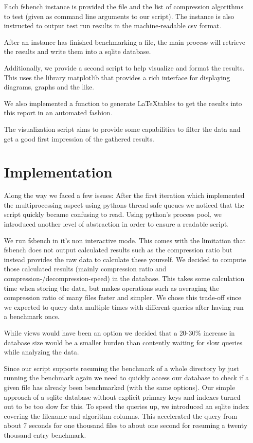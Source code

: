 \documentclass[
	12pt,
	a4paper,
	BCOR10mm,
	DIV14,
	listof=totoc,
	bibliography=totoc,
	headsepline
]{scrreprt}
\begin{document}
Each fsbench instance is provided the file and the list of compression algorithms to test (given as command line arguments to our script). The instance is also instructed to output test run results in the machine-readable csv format.

After an instance has finished benchmarking a file, the main process will retrieve the results and write them into a sqlite database.

Additionally, we provide a second script to help visualize and format the results.
This uses the library matplotlib that provides a rich interface for displaying diagrams, graphs and the like.

We also implemented a function to generate \LaTeX tables to get the results into this report in an automated fashion.

The visualization script aims to provide some capabilities to filter the data and get a good first impression of the gathered results.

\section{Implementation}

Along the way we faced a few issues: After the first iteration which implemented the multiprocessing aspect using pythons thread safe queues we noticed that the script quickly became confusing to read. Using python's process pool, we introduced another level of abstraction in order to ensure a readable script.

We run fsbench in it's non interactive mode. This comes with the limitation that fsbench does not output calculated results such as the compression ratio but instead provides the raw data to calculate these yourself. We decided to compute those calculated results (mainly compression ratio and compression-/decompression-speed) in the database. This takes some calculation time when storing the data, but makes operations such as averaging the compression ratio of many files faster and simpler. We chose this trade-off since we expected to query data multiple times with different queries after having run a benchmark once.

While views would have been an option we decided that a 20-30\% increase in database size would be a smaller burden than contently waiting for slow queries while analyzing the data.

Since our script supports resuming the benchmark of a whole directory by just running the benchmark again we need to quickly access our database to check if a given file has already been benchmarked (with the same options). Our simple approach of a sqlite database without explicit primary keys and indexes turned out to be too slow for this.
To speed the queries up, we introduced an sqlite index covering the filename and algorithm columns. This accelerated the query from about 7 seconds for one thousand files to about one second for resuming a twenty thousand entry benchmark.
\end{document}
